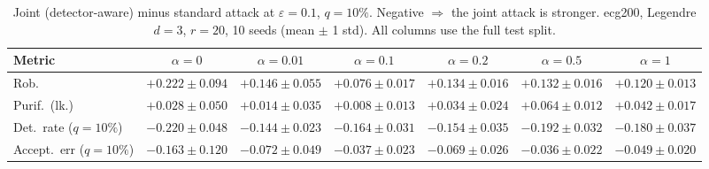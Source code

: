 \begin{table}[htbp]
  \centering
  \small
  \begin{tabular}{@{}lcccccc@{}}
    \toprule
    Metric & $\alpha{=}0$ & $\alpha{=}0.01$ & $\alpha{=}0.1$ & $\alpha{=}0.2$ & $\alpha{=}0.5$ & $\alpha{=}1$ \\
    \midrule
    Rob. & $+0.222 \pm 0.094$ & $+0.146 \pm 0.055$ & $+0.076 \pm 0.017$ & $+0.134 \pm 0.016$ & $+0.132 \pm 0.016$ & $+0.120 \pm 0.013$ \\
    Purif.\ (lk.) & $+0.028 \pm 0.050$ & $+0.014 \pm 0.035$ & $+0.008 \pm 0.013$ & $+0.034 \pm 0.024$ & $+0.064 \pm 0.012$ & $+0.042 \pm 0.017$ \\
    Det.\ rate ($q{=}10\%$) & $-0.220 \pm 0.048$ & $-0.144 \pm 0.023$ & $-0.164 \pm 0.031$ & $-0.154 \pm 0.035$ & $-0.192 \pm 0.032$ & $-0.180 \pm 0.037$ \\
    Accept.\ err ($q{=}10\%$) & $-0.163 \pm 0.120$ & $-0.072 \pm 0.049$ & $-0.037 \pm 0.023$ & $-0.069 \pm 0.026$ & $-0.036 \pm 0.022$ & $-0.049 \pm 0.020$ \\
    \bottomrule
  \end{tabular}
  \caption{Joint (detector-aware) minus standard attack at $\varepsilon=0.1$, $q{=}10\%$. Negative $\Rightarrow$ the joint attack is stronger. ecg200, Legendre $d{=}3$, $r{=}20$, 10 seeds (mean $\pm$ 1 std). All columns use the full test split.}
  \label{tab:ecg200_joint_r20_eps0.1}
\end{table}

